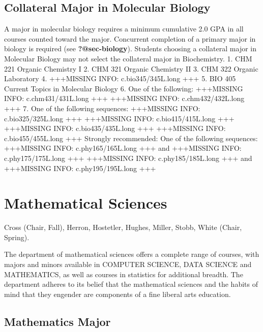 \documentclass[
  letterpaper,
]{scrbook}
\begin{document}
\hypertarget{collateral-major-in-molecular-biology}{%
\subsection{Collateral Major in Molecular
Biology}\label{collateral-major-in-molecular-biology}}

A major in molecular biology requires a minimum cumulative 2.0 GPA in
all courses counted toward the major. Concurrent completion of a primary
major in biology is required (see \textbf{?@sec-biology}). Students
choosing a collateral major in Molecular Biology may not select the
collateral major in Biochemistry. 1. CHM 221 Organic Chemistry I 2. CHM
321 Organic Chemistry II 3. CHM 322 Organic Laboratory 4. +++MISSING
INFO: c.bio345/345L.long +++ 5. BIO 405 Current Topics in Molecular
Biology 6. One of the following: +++MISSING INFO: c.chm431/431L.long +++
+++MISSING INFO: c.chm432/432L.long +++ 7. One of the following
sequences: +++MISSING INFO: c.bio325/325L.long +++ +++MISSING INFO:
c.bio415/415L.long +++ +++MISSING INFO: c.bio435/435L.long +++
+++MISSING INFO: c.bio455/455L.long +++ Strongly recommended: One of the
following sequences: +++MISSING INFO: c.phy165/165L.long +++ and
+++MISSING INFO: c.phy175/175L.long +++ +++MISSING INFO:
c.phy185/185L.long +++ and +++MISSING INFO: c.phy195/195L.long +++

\hypertarget{sec-mathematical-sciences}{%
\section{Mathematical Sciences}\label{sec-mathematical-sciences}}

Cross (Chair, Fall), Herron, Hostetler, Hughes, Miller, Stobb, White
(Chair, Spring).

The department of mathematical sciences offers a complete range of
courses, with majors and minors available in COMPUTER SCIENCE, DATA
SCIENCE and MATHEMATICS, as well as courses in statistics for additional
breadth. The department adheres to its belief that the mathematical
sciences and the habits of mind that they engender are components of a
fine liberal arts education.

\hypertarget{mathematics-major}{%
\subsection{Mathematics Major}\label{mathematics-major}}
\end{document}
